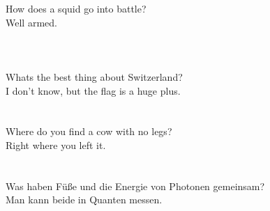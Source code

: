 
\usepackage{blindtext}



How does a squid go into battle?\\
Well armed.\\\\

\blindtext
\blindtext \\\\



Whats the best thing about Switzerland?\\
I don't know, but the flag is a huge plus.\\


\blindtext
\blindtext\\\\

Where do you find a cow with no legs?\\
Right where you left it.\\

\blindtext
\blindtext\\\\

Was haben Füße und die Energie von Photonen gemeinsam?\\
Man kann beide in Quanten messen.

